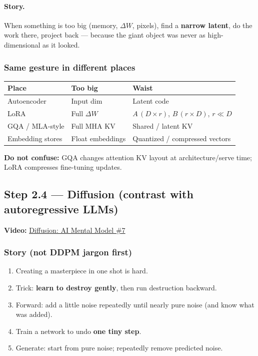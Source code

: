 \documentclass[11pt,a4paper]{article}
\begin{document}
\paragraph{Story.}

When something is too big (memory, \(\Delta W\), pixels), find a \textbf{narrow latent}, do the work there, project back --- because the giant object was never as high-dimensional as it looked.


\subsubsection{Same gesture in different places}

\begin{table}[ht]
\centering\small
\begin{tabularx}{\textwidth}{@{}YYY@{}}
\toprule
\textbf{Place} & \textbf{Too big} & \textbf{Waist} \\
\midrule
Autoencoder & Input dim & Latent code \\
LoRA & Full \(\Delta W\) & \(A\,(D\times r)\), \(B\,(r\times D)\), \(r\ll D\) \\
GQA / MLA-style & Full MHA KV & Shared / latent KV \\
Embedding stores & Float embeddings & Quantized / compressed vectors \\
\bottomrule
\end{tabularx}
\end{table}


\textbf{Do not confuse:} GQA changes attention KV layout at architecture/serve time; LoRA compresses fine-tuning updates.


\subsection{Step 2.4 --- Diffusion (contrast with autoregressive LLMs)}


\textbf{Video:} \href{https://www.youtube.com/watch?v=bTEfdB2D1Ek}{Diffusion: AI Mental Model \#7}


\subsubsection{Story (not DDPM jargon first)}

\begin{enumerate}
\item Creating a masterpiece in one shot is hard.  
\item Trick: \textbf{learn to destroy gently}, then run destruction backward.  
\item Forward: add a little noise repeatedly until nearly pure noise (and know what was added).  
\item Train a network to undo \textbf{one tiny step}.  
\item Generate: start from pure noise; repeatedly remove predicted noise.
\end{enumerate}
\end{document}
